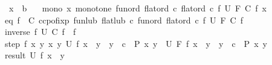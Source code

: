 \begin{isabellebody}
\ \ \ \ x\ {\isacharcolon}{\kern0pt}{\isacharcolon}{\kern0pt}\ {\isachardoublequoteopen}{\isacharprime}{\kern0pt}b{\isachardoublequoteclose}\isanewline
\ \ \ mono{\isacharcolon}{\kern0pt}\ {\isachardoublequoteopen}{\isasymAnd}x{\isachardot}{\kern0pt}\ monotone\ {\isacharparenleft}{\kern0pt}fun{\isacharunderscore}{\kern0pt}ord\ {\isacharparenleft}{\kern0pt}flat{\isacharunderscore}{\kern0pt}ord\ c{\isacharparenright}{\kern0pt}{\isacharparenright}{\kern0pt}\ {\isacharparenleft}{\kern0pt}flat{\isacharunderscore}{\kern0pt}ord\ c{\isacharparenright}{\kern0pt}\ {\isacharparenleft}{\kern0pt}{\isasymlambda}f{\isachardot}{\kern0pt}\ U\ {\isacharparenleft}{\kern0pt}F\ {\isacharparenleft}{\kern0pt}C\ f{\isacharparenright}{\kern0pt}{\isacharparenright}{\kern0pt}\ x{\isacharparenright}{\kern0pt}{\isachardoublequoteclose}\isanewline
\ \ \ eq{\isacharcolon}{\kern0pt}\ {\isachardoublequoteopen}f\ {\isasymequiv}\ C\ {\isacharparenleft}{\kern0pt}ccpo{\isachardot}{\kern0pt}fixp\ {\isacharparenleft}{\kern0pt}fun{\isacharunderscore}{\kern0pt}lub\ {\isacharparenleft}{\kern0pt}flat{\isacharunderscore}{\kern0pt}lub\ c{\isacharparenright}{\kern0pt}{\isacharparenright}{\kern0pt}\ {\isacharparenleft}{\kern0pt}fun{\isacharunderscore}{\kern0pt}ord\ {\isacharparenleft}{\kern0pt}flat{\isacharunderscore}{\kern0pt}ord\ c{\isacharparenright}{\kern0pt}{\isacharparenright}{\kern0pt}\ {\isacharparenleft}{\kern0pt}{\isasymlambda}f{\isachardot}{\kern0pt}\ U\ {\isacharparenleft}{\kern0pt}F\ {\isacharparenleft}{\kern0pt}C\ f{\isacharparenright}{\kern0pt}{\isacharparenright}{\kern0pt}{\isacharparenright}{\kern0pt}{\isacharparenright}{\kern0pt}{\isachardoublequoteclose}\isanewline
\ \ \ inverse{}{\isacharcolon}{\kern0pt}\ {\isachardoublequoteopen}{\isasymAnd}f{\isachardot}{\kern0pt}\ U\ {\isacharparenleft}{\kern0pt}C\ f{\isacharparenright}{\kern0pt}\ {\isacharequal}{\kern0pt}\ f{\isachardoublequoteclose}\isanewline
\ \ \ step{\isacharcolon}{\kern0pt}\ {\isachardoublequoteopen}{\isasymAnd}f\ x\ y{\isachardot}{\kern0pt}\ {\isacharparenleft}{\kern0pt}{\isasymAnd}x\ y{\isachardot}{\kern0pt}\ U\ f\ x\ {\isacharequal}{\kern0pt}\ y\ {\isasymLongrightarrow}\ y\ {\isasymnoteq}\ c\ {\isasymLongrightarrow}\ P\ x\ y{\isacharparenright}{\kern0pt}\ {\isasymLongrightarrow}\ U\ {\isacharparenleft}{\kern0pt}F\ f{\isacharparenright}{\kern0pt}\ x\ {\isacharequal}{\kern0pt}\ y\ {\isasymLongrightarrow}\ y\ {\isasymnoteq}\ c\ {\isasymLongrightarrow}\ P\ x\ y{\isachardoublequoteclose}\isanewline
\ \ \ result{\isacharcolon}{\kern0pt}\ {\isachardoublequoteopen}U\ f\ x\ {\isacharequal}{\kern0pt}\ y{\isachardoublequoteclose}\isanewline

\end{isabellebody}
